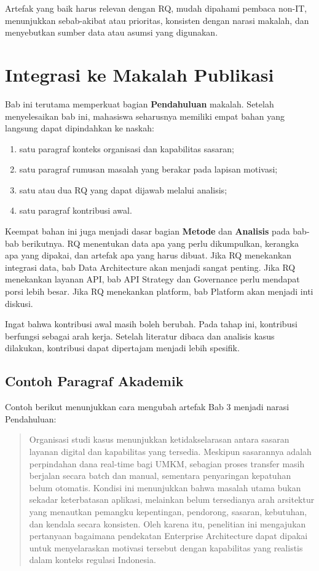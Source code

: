 Artefak yang baik harus relevan dengan RQ, mudah dipahami pembaca non-IT,
menunjukkan sebab-akibat atau prioritas, konsisten dengan narasi makalah, dan
menyebutkan sumber data atau asumsi yang digunakan.

\section{Integrasi ke Makalah Publikasi}

Bab ini terutama memperkuat bagian \textbf{Pendahuluan} makalah. Setelah
menyelesaikan bab ini, mahasiswa seharusnya memiliki empat bahan yang langsung
dapat dipindahkan ke naskah:

\begin{enumerate}
  \item satu paragraf konteks organisasi dan kapabilitas sasaran;
  \item satu paragraf rumusan masalah yang berakar pada lapisan motivasi;
  \item satu atau dua RQ yang dapat dijawab melalui analisis;
  \item satu paragraf kontribusi awal.
\end{enumerate}

Keempat bahan ini juga menjadi dasar bagian \textbf{Metode} dan
\textbf{Analisis} pada bab-bab berikutnya. RQ menentukan data apa yang perlu
dikumpulkan, kerangka apa yang dipakai, dan artefak apa yang harus dibuat. Jika
RQ menekankan integrasi data, bab Data Architecture akan menjadi sangat penting.
Jika RQ menekankan layanan API, bab API Strategy dan Governance perlu mendapat
porsi lebih besar. Jika RQ menekankan platform, bab Platform akan menjadi inti
diskusi.

Ingat bahwa kontribusi awal masih boleh berubah. Pada tahap ini, kontribusi
berfungsi sebagai arah kerja. Setelah literatur dibaca dan analisis kasus
dilakukan, kontribusi dapat dipertajam menjadi lebih spesifik.

\subsection*{Contoh Paragraf Akademik}

Contoh berikut menunjukkan cara mengubah artefak Bab 3 menjadi narasi
Pendahuluan:

\begin{quote}
Organisasi studi kasus menunjukkan ketidakselarasan antara sasaran layanan
digital dan kapabilitas yang tersedia. Meskipun sasarannya adalah perpindahan
dana real-time bagi UMKM, sebagian proses transfer masih berjalan secara batch
dan manual, sementara penyaringan kepatuhan belum otomatis. Kondisi ini
menunjukkan bahwa masalah utama bukan sekadar keterbatasan aplikasi, melainkan
belum tersedianya arah arsitektur yang menautkan pemangku kepentingan,
pendorong, sasaran, kebutuhan, dan kendala secara konsisten. Oleh karena itu,
penelitian ini mengajukan pertanyaan bagaimana pendekatan Enterprise
Architecture dapat dipakai untuk menyelaraskan motivasi tersebut dengan
kapabilitas yang realistis dalam konteks regulasi Indonesia.
\end{quote}

